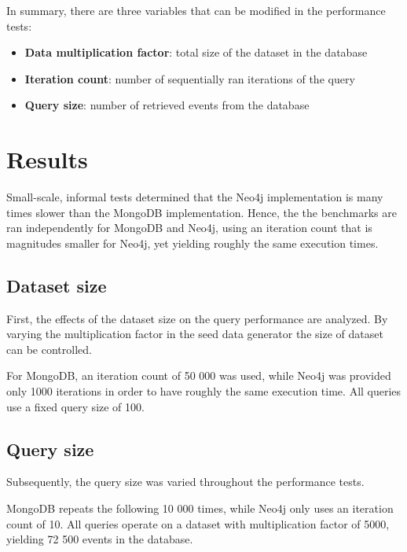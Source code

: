 In summary, there are three variables that can be modified in the performance tests:

\begin{itemize}
  \item \textbf{Data multiplication factor}: total size of the dataset in the database
  \item \textbf{Iteration count}: number of sequentially ran iterations of the query
  \item \textbf{Query size}: number of retrieved events from the database
\end{itemize}

\section{Results}
\label{sec:results}

Small-scale, informal tests determined that the Neo4j implementation is many times slower than the MongoDB implementation.
Hence, the the benchmarks are ran independently for MongoDB and Neo4j, using an iteration count that is magnitudes smaller for Neo4j, yet yielding roughly the same execution times.

\subsection{Dataset size}
\label{subsec:dataset-size}

First, the effects of the dataset size on the query performance are analyzed.
By varying the multiplication factor in the seed data generator the size of dataset can be controlled.

For MongoDB, an iteration count of 50 000 was used, while Neo4j was provided only 1000 iterations in order to have roughly the same execution time.
All queries use a fixed query size of 100.



\subsection{Query size}
\label{subsec:query-size}

Subsequently, the query size was varied throughout the performance tests.

MongoDB repeats the following 10 000 times, while Neo4j only uses an iteration count of 10.
All queries operate on a dataset with multiplication factor of 5000, yielding 72 500 events in the database.

